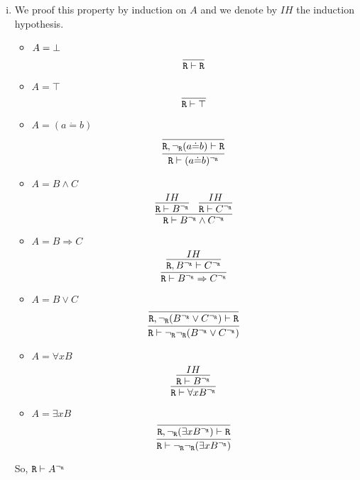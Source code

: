\begin{enumerate}[(i)]
    \item We proof this property by induction on $A$ and we denote by $IH$ the induction hypothesis.
    \begin{itemize}
        \item $A=\bot$
            $$
                \infer{
                    \R \vdash \R
                }{
                }
            $$
        \item $A=\top$
            $$
                \infer{
                    \R \vdash \top
                }{
                }
            $$
        \item $A=(a \dot{=} b)$
            $$
                \infer{
                    \R \vdash (a \dot{=} b)^{\neg_\R}
                }{
                    \infer{
                        \R, \neg_\R(a \dot{=} b) \vdash \R
                    }{
                    }
                }
            $$
        \item $A=B\wedge C$
            $$
                \infer{
                    \R \vdash B^\ngr \wedge C^\ngr
                }{
                    \infer{
                        \R \vdash B^\ngr
                    }{
                        IH
                    }&
                    \infer{
                        \R \vdash C^\ngr
                    }{
                        IH
                    }
                }
            $$
        \item $A=B \Rightarrow C$
            $$
                \infer{
                    \R \vdash B^\ngr \Rightarrow C^\ngr
                }{
                    \infer{
                        \R, B^\ngr \vdash C^\ngr
                    }{
                        IH
                    }
                }
            $$
        \item $A=B \vee C$
            $$
                \infer{
                    \R \vdash \ngr\ngr(B^\ngr \vee C^\ngr)
                }{
                    \infer{
                        \R, \ngr(B^\ngr \vee C^\ngr) \vdash \R
                    }{
                    }
                }
            $$
        \item $A=\forall x B$
            $$
                \infer{
                    \R \vdash \forall x B^\ngr
                }{
                    \infer{
                        \R \vdash B^\ngr
                    }{
                        IH
                    }
                }
            $$
        \item $A=\exists x B$
            $$
                \infer{
                    \R \vdash \ngr\ngr(\exists x B^\ngr)
                }{
                    \infer{
                        \R, \ngr(\exists x B^\ngr) \vdash \R
                    }{
                    }
                }
            $$
    \end{itemize}
    So, $\texttt{R}\vdash A^{\neg_{\texttt{R}}}$
    

\end{enumerate}

